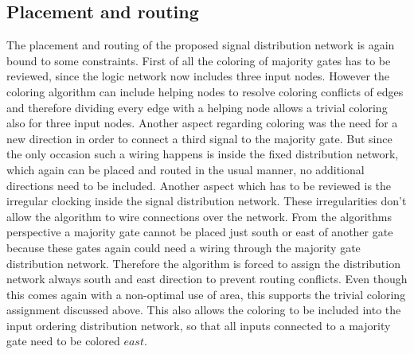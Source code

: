 \subsection{Placement and routing}
The placement and routing of the proposed signal distribution network is again bound to some constraints. First of all the coloring of majority gates has to be reviewed, since the logic network now includes three input nodes. However the coloring algorithm can include helping nodes to resolve coloring conflicts of edges and therefore dividing every edge with a helping node allows a trivial coloring also for three input nodes. Another aspect regarding coloring was the need for a new direction in order to connect a third signal to the majority gate. But since the only occasion such a wiring happens is inside the fixed distribution network, which again can be placed and routed in the usual manner, no additional directions need to be included. Another aspect which has to be reviewed is the irregular clocking inside the signal distribution network. These irregularities don't allow the algorithm to wire connections over the network. From the algorithms perspective a majority gate cannot be placed just south or east of another gate because these gates again could need a wiring through the majority gate distribution network. Therefore the algorithm is forced to assign the distribution network always south and east direction to prevent routing conflicts. Even though this comes again with a non-optimal use of area, this supports the trivial coloring assignment discussed above. This also allows the coloring to be included into the input ordering distribution network, so that all inputs connected to a majority gate need to be colored $east$.

